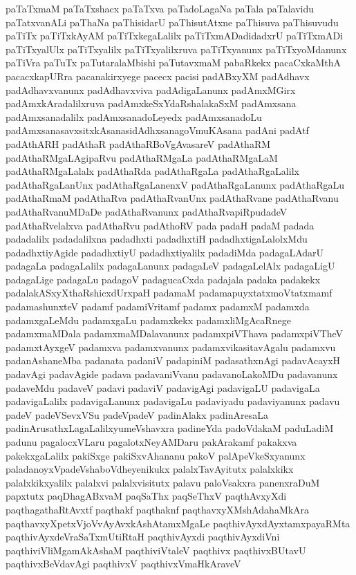 {paTaTxmaM
paTaTxshacx
paTaTxva
paTadoLagaNa
paTala
paTalavidu
paTatxvanALi
paThaNa
paThisidarU
paThisutAtxne
paThisuva
paThisuvudu
paTiTx
paTiTxkAyAM
paTiTxkegaLalilx
paTiTxmADadidadxrU
paTiTxmADi
paTiTxyalUlx
paTiTxyalilx
paTiTxyalilxruva
paTiTxyanunx
paTiTxyoMdanunx
paTiVra
paTuTx
paTutaralaMbishi
paTutavxmaM
pabaRkekx
pacaCxkaMthA
pacacxkapURra
pacanakirxyege
pacecx
pacisi
padABxyXM
padAdhavx
padAdhavxvanunx
padAdhavxviva
padAdigaLanunx
padAmxMGirx
padAmxkAradalilxruva
padAmxkeSxYdaRshalakaSxM
padAmxsana
padAmxsanadalilx
padAmxsanadoLeyedx
padAmxsanadoLu
padAmxsanasavxsitxkAsanasidAdhxsanagoVmuKAsana
padAni
padAtf
padAthARH
padAthaR
padAthaRBoVgAvasareV
padAthaRM
padAthaRMgaLAgipaRvu
padAthaRMgaLa
padAthaRMgaLaM
padAthaRMgaLalalx
padAthaRda
padAthaRgaLa
padAthaRgaLalilx
padAthaRgaLanUnx
padAthaRgaLanenxV
padAthaRgaLanunx
padAthaRgaLu
padAthaRmaM
padAthaRva
padAthaRvanUnx
padAthaRvane
padAthaRvanu
padAthaRvanuMDaDe
padAthaRvanunx
padAthaRvapiRpudadeV
padAthaRvelalxva
padAthaRvu
padAthoRV
pada
padaH
padaM
padada
padadalilx
padadalilxna
padadhxti
padadhxtiH
padadhxtigaLalolxMdu
padadhxtiyAgide
padadhxtiyU
padadhxtiyalilx
padadiMda
padagaLAdarU
padagaLa
padagaLalilx
padagaLanunx
padagaLeV
padagaLelAlx
padagaLigU
padagaLige
padagaLu
padagoV
padagucaCxda
padajala
padaka
padakekx
padalakASxyXthaRshicxdUrxpaH
padamaM
padamapuyxtatxmoVtatxmamf
padamashunxteV
padamf
padamiVritamf
padamx
padamxM
padamxda
padamxgaLeMdu
padamxgaLu
padamxkekx
padamxliMgAcaRnege
padamxmaMDala
padamxmaMDalavanunx
padamxpiVThava
padamxpiVTheV
padamxtAyxgeV
padamxva
padamxvanunx
padamxvikasitavAgalu
padamxvu
padanAshaneMba
padanata
padaniV
padapiniM
padasathxnAgi
padavAcayxH
padavAgi
padavAgide
padava
padavaniVvanu
padavanoLakoMDu
padavanunx
padaveMdu
padaveV
padavi
padaviV
padavigAgi
padavigaLU
padavigaLa
padavigaLalilx
padavigaLanunx
padavigaLu
padaviyadu
padaviyanunx
padavu
padeV
padeVSevxVSu
padeVpadeV
padinAlakx
padinAresaLa
padinArusathxLagaLalilxyumeVshavxra
padineYda
padoVdakaM
paduLadiM
padunu
pagalocxVLaru
pagalotxNeyAMDaru
pakArakamf
pakakxva
pakekxgaLalilx
pakiSxge
pakiSxvAhananu
pakoV
palApeVkeSxyanunx
paladanoyxVpadeVshaboVdheyenikukx
palalxTavAyitutx
palalxkikx
palalxkikxyalilx
palalxvi
palalxvisitutx
palavu
paloVsakxra
panenxraDuM
papxtutx
paqDhagABxvaM
paqSaThx
paqSeThxV
paqthAvxyXdi
paqthagathaRtAvxtf
paqthakf
paqthaknf
paqthavxyXMshAdahaMkAra
paqthavxyXpetxVjoVvAyAvxkAshAtamxMgaLe
paqthivAyxdAyxtamxpayaRMta
paqthivAyxdeVraSaTxmUtiRtaH
paqthivAyxdi
paqthivAyxdiVni
paqthiviVliMgamAkAshaM
paqthiviVtaleV
paqthivx
paqthivxBUtavU
paqthivxBeVdavAgi
paqthivxV
paqthivxVmaHkAraveV
}
